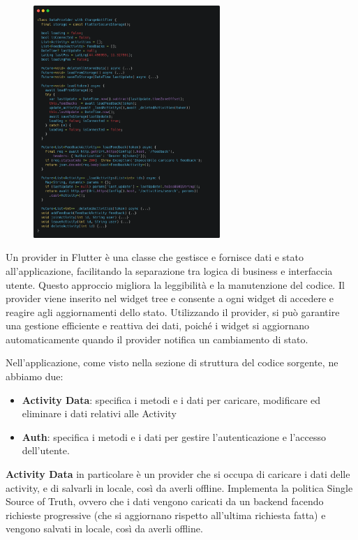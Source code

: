 \documentclass[a4paper,12pt]{article}
\begin{document}
\begin{figure}
    \includegraphics[width=0.63\textwidth]{img/data_provider.png}
\end{figure}
Un provider in Flutter è una classe che gestisce e fornisce dati e stato all'applicazione, facilitando la separazione tra logica di business e interfaccia utente. Questo approccio migliora la leggibilità e la manutenzione del codice. Il provider viene inserito nel widget tree e consente a ogni widget di accedere e reagire agli aggiornamenti dello stato. Utilizzando il provider, si può garantire una gestione efficiente e reattiva dei dati, poiché i widget si aggiornano automaticamente quando il provider notifica un cambiamento di stato. 

Nell'applicazione, come visto nella sezione di struttura del codice sorgente, ne abbiamo due:

\begin{itemize}
    \item \textbf{Activity Data}: specifica i metodi e i dati per caricare, modificare ed eliminare i dati relativi alle Activity
    \item \textbf{Auth}: specifica i metodi e i dati per gestire l'autenticazione e l'accesso dell'utente.
\end{itemize}

\textbf{Activity Data} in particolare è un provider che si occupa di caricare i dati delle activity, e di salvarli in locale, così da averli offline.
Implementa la politica Single Source of Truth, ovvero che i dati vengono caricati da un backend facendo richieste progressive (che si aggiornano rispetto all'ultima richiesta fatta) e vengono salvati in locale, così da averli offline.
\end{document}
